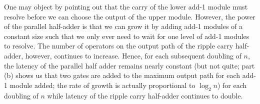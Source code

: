 \documentclass{article}
\begin{document}
One may object by pointing out that the carry of the lower add-1 module must resolve before we can choose the output of the upper module. However, the power of the parallel half-adder is that we can grow it by adding add-1 modules of a constant size such that we only ever need to wait for one level of add-1 modules to resolve. The number of operators on the output path of the ripple carry half-adder, however, continues to increase. Hence, for each subsequent doubling of $n$, the latency of the parallel half adder remains nearly constant (but not quite; part (b) shows us that two gates are added to the maximum output path for each add-1 module added; the rate of growth is actually proportional to $\log_2 n$) for each doubling of $n$ while latency of the ripple carry half-adder continues to double.

\pagebreak
\end{document}
